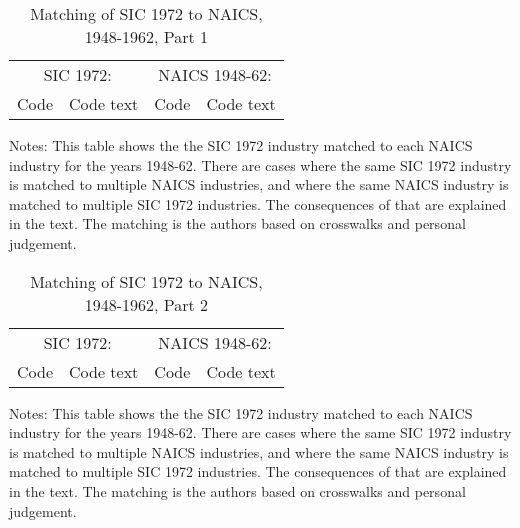 \documentclass[11pt]{article}
\begin{document}
\begin{table}[!htb]
\begin{center}
\label{TAB_match1}
\caption{Matching of SIC 1972 to NAICS, 1948-1962, Part 1}
{\footnotesize
\begin{tabular}{llll}
\midrule
\multicolumn{2}{c}{SIC 1972:} & \multicolumn{2}{c}{NAICS 1948-62:} \\ \cmidrule(lr){1-2} \cmidrule(lr){3-4}
Code  & Code text  & Code & Code text \\ 
\midrule

\midrule
\end{tabular}
}
\end{center}
{\footnotesize Notes: This table shows the the SIC 1972 industry matched to each NAICS industry for the years 1948-62. There are cases where the same SIC 1972 industry is matched to multiple NAICS industries, and where the same NAICS industry is matched to multiple SIC 1972 industries. The consequences of that are explained in the text. The matching is the authors based on crosswalks and personal judgement.}
\end{table}


\begin{table}[!htb]
\begin{center}
\label{TAB_match2}
\caption{Matching of SIC 1972 to NAICS, 1948-1962, Part 2}
{\footnotesize
\begin{tabular}{llll}
\midrule
\multicolumn{2}{c}{SIC 1972:} & \multicolumn{2}{c}{NAICS 1948-62:} \\ \cmidrule(lr){1-2} \cmidrule(lr){3-4}
Code  & Code text  & Code & Code text \\ 
\midrule

\midrule
\end{tabular}
}
\end{center}
{\footnotesize Notes: This table shows the the SIC 1972 industry matched to each NAICS industry for the years 1948-62. There are cases where the same SIC 1972 industry is matched to multiple NAICS industries, and where the same NAICS industry is matched to multiple SIC 1972 industries. The consequences of that are explained in the text. The matching is the authors based on crosswalks and personal judgement.}
\end{table}
\end{document}
